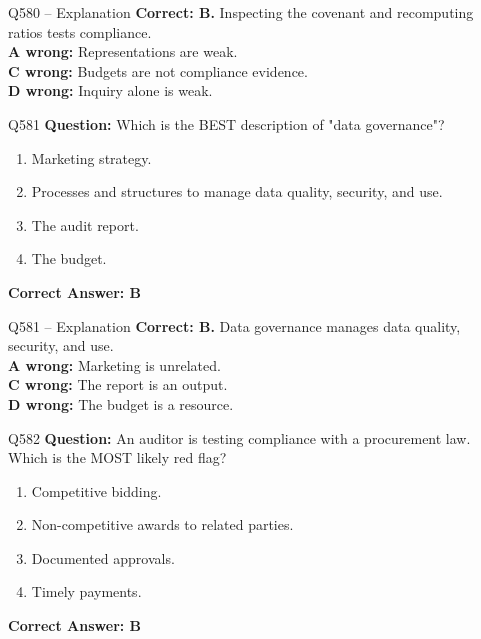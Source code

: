 \documentclass[aspectratio=169,10pt]{beamer}
\begin{document}
	\begin{frame}[t]{Q580 -- Explanation}
		\small
		\textbf{Correct: B.} Inspecting the covenant and recomputing ratios tests compliance. \\[4pt]
		\textbf{A wrong:} Representations are weak. \\[2pt]
		\textbf{C wrong:} Budgets are not compliance evidence. \\[2pt]
		\textbf{D wrong:} Inquiry alone is weak.
	\end{frame}
	
	\begin{frame}[t]{Q581}
		\small
		\textbf{Question:} Which is the BEST description of "data governance"?
		\begin{enumerate}[label=\Alph*.,itemsep=1pt,topsep=2pt]
			\item Marketing strategy.
			\item Processes and structures to manage data quality, security, and use.
			\item The audit report.
			\item The budget.
		\end{enumerate}
		\vspace{4pt}
		\textbf{Correct Answer: B}
	\end{frame}
	
	\begin{frame}[t]{Q581 -- Explanation}
		\small
		\textbf{Correct: B.} Data governance manages data quality, security, and use. \\[4pt]
		\textbf{A wrong:} Marketing is unrelated. \\[2pt]
		\textbf{C wrong:} The report is an output. \\[2pt]
		\textbf{D wrong:} The budget is a resource.
	\end{frame}
	
	\begin{frame}[t]{Q582}
		\small
		\textbf{Question:} An auditor is testing compliance with a procurement law. Which is the MOST likely red flag?
		\begin{enumerate}[label=\Alph*.,itemsep=1pt,topsep=2pt]
			\item Competitive bidding.
			\item Non-competitive awards to related parties.
			\item Documented approvals.
			\item Timely payments.
		\end{enumerate}
		\vspace{4pt}
		\textbf{Correct Answer: B}
	\end{frame}
	
\end{document}
